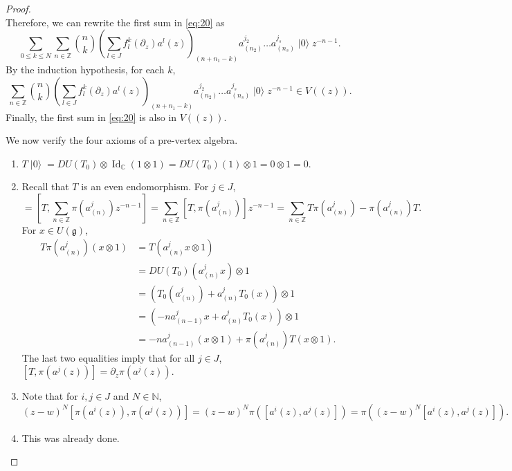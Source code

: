 \documentclass[a4paper, 12pt, reqno]{amsart}
\theoremstyle{remark}
\numberwithin{equation}{subsection}
\DeclareMathOperator{\Id}{Id}
\DeclareMathOperator{\vac}{|0\rangle}
\begin{document}
\begin{proof}
\begin{equation*}
  \end{equation*}
  Therefore, we can rewrite the first sum in \eqref{eq:20} as
  \begin{equation*}
    \sum_{0 \le k \le N}\sum_{n \in \mathbb{Z}}\binom{n}{k}\left(\sum_{l \in J}f^k_l(\partial_z)a^l(z)\right)_{(n + n_1 - k)}a^{j_2}_{(n_2)}\dots a^{j_s}_{(n_s)}\vac z^{-n - 1}.
  \end{equation*}
  By the induction hypothesis, for each $k$,
  \begin{equation*}
    \sum_{n \in \mathbb{Z}}\binom{n}{k}\left(\sum_{l \in J}f^k_l(\partial_z)a^l(z)\right)_{(n + n_1 - k)}a^{j_2}_{(n_2)}\dots a^{j_s}_{(n_s)}\vac z^{-n - 1} \in V((z)).
  \end{equation*}
  Finally, the first sum in \eqref{eq:20} is also in $V((z))$.

  We now verify the four axioms of a pre-vertex algebra.
  \begin{enumerate}
  \item $T\vac = DU(T_0)\otimes \Id_{\mathbb{C}}(1\otimes1) = DU(T_0)(1)\otimes1 = 0\otimes1 = 0$.
  \item Recall that $T$ is an even endomorphism.
    For $j \in J$,
    \begin{equation*}
      [T, \pi(a^j(z))] = \left[T, \sum_{n \in \mathbb{Z}}\pi(a^j_{(n)})z^{-n - 1}\right] = \sum_{n \in \mathbb{Z}}[T, \pi(a^j_{(n)})]z^{-n - 1} = \sum_{n \in \mathbb{Z}}T\pi(a^j_{(n)}) - \pi(a^j_{(n)})T.
    \end{equation*}
    For $x \in U(\mathfrak{g})$,
    \begin{align*}
      T\pi(a^j_{(n)})(x\otimes1) &= T(a^j_{(n)}x\otimes1) \\
      &= DU(T_0)(a^j_{(n)}x)\otimes1 \\
      &= (T_0(a^j_{(n)}) + a^j_{(n)}T_0(x))\otimes1 \\
      &= (-na^j_{(n - 1)}x + a^j_{(n)}T_0(x))\otimes1 \\
      &= -na^j_{(n - 1)}(x\otimes1) + \pi(a^j_{(n)})T(x\otimes 1).
    \end{align*}
    The last two equalities imply that for all $j \in J$, $[T, \pi(a^j(z))] = \partial_z\pi(a^j(z))$.
  \item Note that for $i, j \in J$ and $N \in \mathbb{N}$,
    \begin{equation*}
      (z - w)^N[\pi(a^i(z)), \pi(a^j(z))] = (z - w)^N\pi([a^i(z), a^j(z)]) = \pi((z - w)^N[a^i(z), a^j(z)]).
    \end{equation*}
  \item This was already done. \qedhere
  \end{enumerate}
\end{proof}
\end{document}
